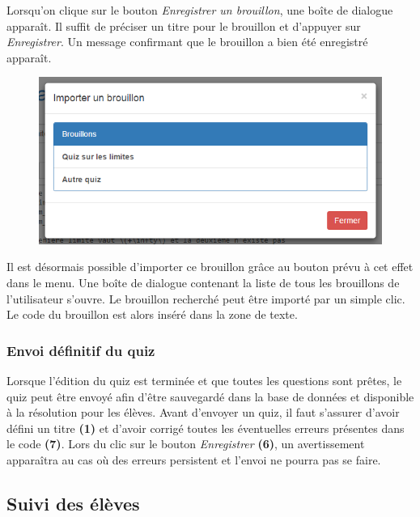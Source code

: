 \documentclass[a4,10pt,french]{sphinxmanual}
\begin{document}
Lorsqu'on clique sur le bouton \emph{Enregistrer un brouillon}, une boîte de dialogue apparaît. Il suffit de préciser un titre pour le brouillon et d'appuyer sur \emph{Enregistrer}. Un message confirmant que le brouillon a bien été enregistré apparaît.
\begin{figure}[htbp]
\centering

\includegraphics{draft-import.png}
\end{figure}

Il est désormais possible d'importer ce brouillon grâce au bouton prévu à cet effet dans le menu. Une boîte de dialogue contenant la liste de tous les brouillons de l'utilisateur s'ouvre. Le brouillon recherché peut être importé par un simple clic. Le code du brouillon est alors inséré dans la zone de texte.


\subsubsection{Envoi définitif du quiz}
\label{doc-user:envoi-definitif-du-quiz}
Lorsque l'édition du quiz est terminée et que toutes les questions sont prêtes, le quiz peut être envoyé afin d'être sauvegardé dans la base de données et disponible à la résolution pour les élèves. Avant d'envoyer un quiz, il faut s'assurer d'avoir défini un titre \textbf{(1)} et d'avoir corrigé toutes les éventuelles erreurs présentes dans le code \textbf{(7)}. Lors du clic sur le bouton \emph{Enregistrer} \textbf{(6)}, un avertissement apparaîtra au cas où des erreurs persistent et l'envoi ne pourra pas se faire.


\subsection{Suivi des élèves}
\label{doc-user:suivi-des-eleves}
\end{document}
